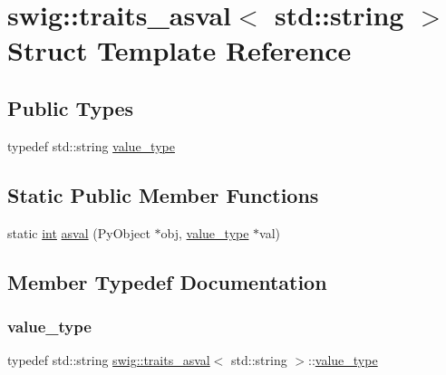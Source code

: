 \hypertarget{structswig_1_1traits__asval_3_01std_1_1string_01_4}{}\section{swig\+:\+:traits\+\_\+asval$<$ std\+:\+:string $>$ Struct Template Reference}
\label{structswig_1_1traits__asval_3_01std_1_1string_01_4}
\subsection*{Public Types}
\begin{DoxyCompactItemize}
\item 
typedef std\+::string \hyperlink{structswig_1_1traits__asval_3_01std_1_1string_01_4_a66eab9ad087e2527eb509f04e6e70d75}{value\+\_\+type}
\end{DoxyCompactItemize}
\subsection*{Static Public Member Functions}
\begin{DoxyCompactItemize}
\item 
static \hyperlink{lp__lib_8h_adeb9ec6400320e4923ac9d836d509ddb}{int} \hyperlink{structswig_1_1traits__asval_3_01std_1_1string_01_4_a1b4d91079cc3870021fac8f5514404ff}{asval} (Py\+Object $\ast$obj, \hyperlink{structswig_1_1traits__asval_3_01std_1_1string_01_4_a66eab9ad087e2527eb509f04e6e70d75}{value\+\_\+type} $\ast$val)
\end{DoxyCompactItemize}


\subsection{Member Typedef Documentation}
\mbox{\label{structswig_1_1traits__asval_3_01std_1_1string_01_4_a66eab9ad087e2527eb509f04e6e70d75}} 
\subsubsection{\texorpdfstring{value\+\_\+type}{value\_type}}
{\footnotesize\ttfamily typedef std\+::string \hyperlink{structswig_1_1traits__asval}{swig\+::traits\+\_\+asval}$<$ std\+::string $>$\+::\hyperlink{structswig_1_1traits__asval_3_01std_1_1string_01_4_a66eab9ad087e2527eb509f04e6e70d75}{value\+\_\+type}}



